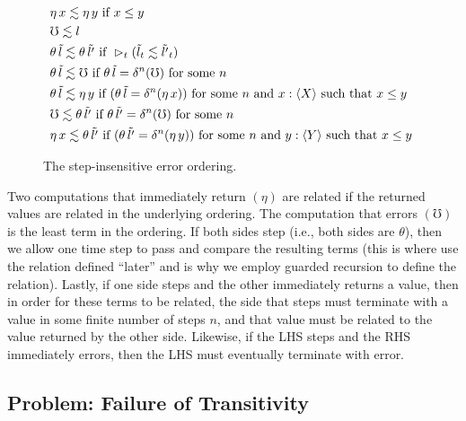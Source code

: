 \begin{figure*}
    \begin{align*}
        &\eta\, x \lesssim \eta\, y \text{ if } 
            x \le y \\
        &\mho \lesssim l \\
        &\theta\, \tilde{l} \lesssim \theta\, \tilde{l'} \text{ if } 
            \vartriangleright_t (\tilde{l}_t \lesssim \tilde{l'}_t) \\
        &\theta\, \tilde{l} \lesssim \mho \text{ if } 
            \theta\, \tilde{l} = \delta^n(\mho) \text { for some $n$ } \\
        &\theta\, \tilde{l} \lesssim \eta\, y \text{ if }
            (\theta\, \tilde{l} = \delta^n(\eta\, x))
        \text { for some $n$ and $x : \langle {X} \rangle$ such that $x \le y$ } \\
        &\mho \lesssim \theta\, \tilde{l'} \text { if } 
            \theta\, \tilde{l'} = \delta^n(\mho) \text { for some $n$ } \\
        &\eta\, x \lesssim \theta\, \tilde{l'} \text { if }
            (\theta\, \tilde{l'} = \delta^n (\eta\, y))
        \text { for some $n$ and $y : \langle {Y} \rangle$ such that $x \le y$ }
    \end{align*}
    \caption{The step-insensitive error ordering.}
    \label{fig:step-insensitive-error-ordering}
\end{figure*}

Two computations that immediately return $(\eta)$ are related if the returned
values are related in the underlying ordering. The computation that errors
$(\mho)$ is the least term in the ordering. If both sides step (i.e., both sides
are $\theta$), then we allow one time step to pass and compare the resulting
terms (this is where use the relation defined ``later'' and is why we employ
guarded recursion to define the relation).
%
Lastly, if one side steps and the other immediately returns a value, then in
order for these terms to be related, the side that steps must terminate with a
value in some finite number of steps $n$, and that value must be related to
the value returned by the other side. Likewise, if the LHS steps and the RHS
immediately errors, then the LHS must eventually terminate with error.

\subsection{Problem: Failure of Transitivity}

